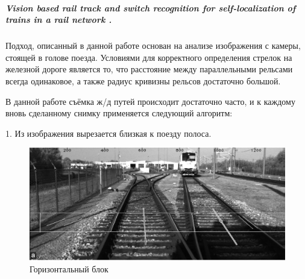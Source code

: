 \subparagraph{Vision based rail track and switch recognition for self-localization of trains in a rail network \cite{b:hough_work1}.}

Подход, описанный в данной работе основан на анализе изображения с камеры, стоящей в голове
поезда. Условиями для корректного определения стрелок на железной дороге является то, что
расстояние между параллельными рельсами всегда одинаковое, а также радиус кривизны рельсов
достаточно большой.

В данной работе съёмка ж/д путей происходит достаточно часто, и к каждому вновь сделанному снимку применяется следующий алгоритм:

1. Из изображения вырезается близкая к поезду полоса.
\begin{figure}[!h]
	\centering
	\includegraphics[width=0.9\linewidth]{pictures/screenshot001}
	\caption{Горизонтальный блок}
	\label{fig:screenshot001}
\end{figure}

